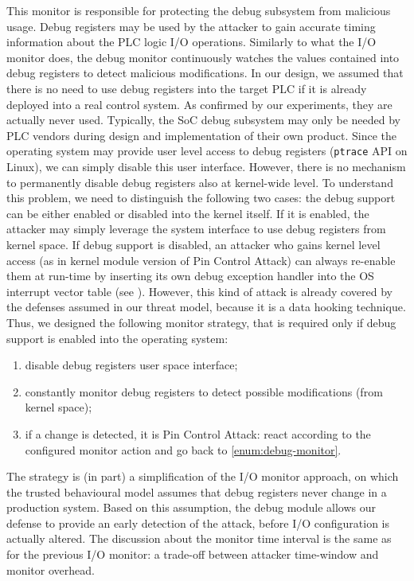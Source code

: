 This monitor is responsible for protecting the debug subsystem from malicious usage. Debug registers may be used by the attacker to gain accurate timing
information about the PLC logic I/O operations.
Similarly to what the I/O monitor does, the debug monitor continuously watches the values contained into debug registers to detect malicious modifications.
In our design, we assumed that there is no need to use debug registers into the target PLC if it is already deployed into a real control system.
As confirmed by our experiments, they are actually never used.
Typically, the SoC debug subsystem may only be needed by PLC vendors during design and implementation of their own product.
Since the operating system may provide user level access to debug registers (\eg \verb|ptrace| API on Linux), we can simply disable this user interface.
However, there is no mechanism to permanently disable debug registers also at kernel-wide level.
To understand this problem, we need to distinguish the following two cases: the debug support can be either enabled or disabled into the kernel itself.
If it is enabled, the attacker may simply leverage the system interface to use debug registers from kernel space.
If debug support is disabled, an attacker who gains kernel level access (as in kernel module version of Pin Control Attack) can always re-enable them at run-time
by inserting its own debug exception handler into the OS interrupt vector table (see \cite{arm-evt,x86-idt}).
However, this kind of attack is already covered by the defenses assumed in our threat model, because it is a data hooking technique.
Thus, we designed the following monitor strategy, that is required only if debug support is enabled into the operating system:
\begin{enumerate}
	\item disable debug registers user space interface;
	\item \label{enum:debug-monitor} constantly monitor debug registers to detect possible modifications (from kernel space);
	\item if a change is detected, it is Pin Control Attack: react according to the configured monitor action and go back to \ref{enum:debug-monitor}.
\end{enumerate}
The strategy is (in part) a simplification of the I/O monitor approach, on which the trusted behavioural model assumes that debug registers never change in a production system.
Based on this assumption, the debug module allows our defense to provide an early detection of the attack, before I/O configuration is actually altered.
The discussion about the monitor time interval is the same as for the previous I/O monitor: a trade-off between attacker time-window and monitor overhead.

